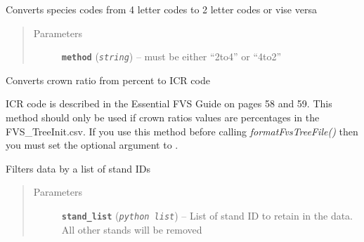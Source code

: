 \documentclass[letterpaper,10pt,english]{sphinxmanual}
\begin{document}
\begin{fulllineitems}
\begin{fulllineitems}
\label{Inventory:fuels.Inventory.convert_sp_codes}
Converts species codes from 4 letter codes to 2 letter codes
or vise versa
\begin{quote}\begin{description}
\item[{Parameters}] \leavevmode
\textbf{\texttt{method}} (\emph{\texttt{string}}) -- must be either ``2to4'' or ``4to2''

\end{description}\end{quote}

\end{fulllineitems}


\begin{fulllineitems}
\label{Inventory:fuels.Inventory.crwratio_percent_to_code}
Converts crown ratio from percent to ICR code

ICR code is described in the Essential FVS Guide on pages 58 and 59.
This method should only be used if crown ratios values are percentages
in the FVS\_TreeInit.csv.  If you use this method before calling
\emph{formatFvsTreeFile()} then you must set the optional argument
 to .

\end{fulllineitems}


\begin{fulllineitems}
\label{Inventory:fuels.Inventory.filter_by_stand}
Filters data by a list of stand IDs
\begin{quote}\begin{description}
\item[{Parameters}] \leavevmode
\textbf{\texttt{stand\_list}} (\emph{\texttt{python list}}) -- List of stand ID to retain in the data. All other
stands will be removed

\end{description}\end{quote}

\end{fulllineitems}


\end{fulllineitems}
\end{document}
